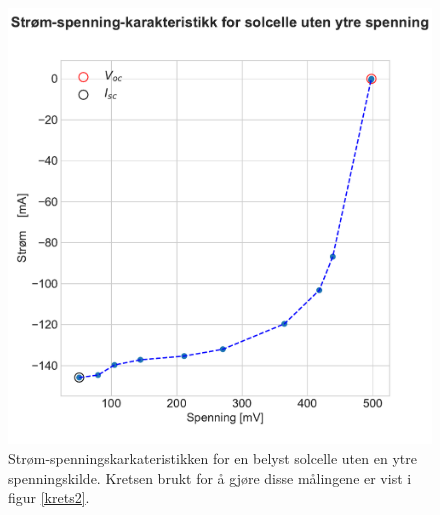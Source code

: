 \documentclass[%
 reprint,
 amsmath,amssymb,
 aps,
 norsk,
 booktabs
]{revtex4-1}
\begin{document}
\begin{figure}
  \centering
  \includegraphics[scale=0.4]{strom_spenning_karr.pdf}
  \caption{Strøm-spenningskarkateristikken for en belyst solcelle uten en ytre spenningskilde. Kretsen brukt for å gjøre disse målingene er vist i figur \vref{krets2}.}
  \label{resultat_uten_spenning}
\end{figure}
\end{document}
